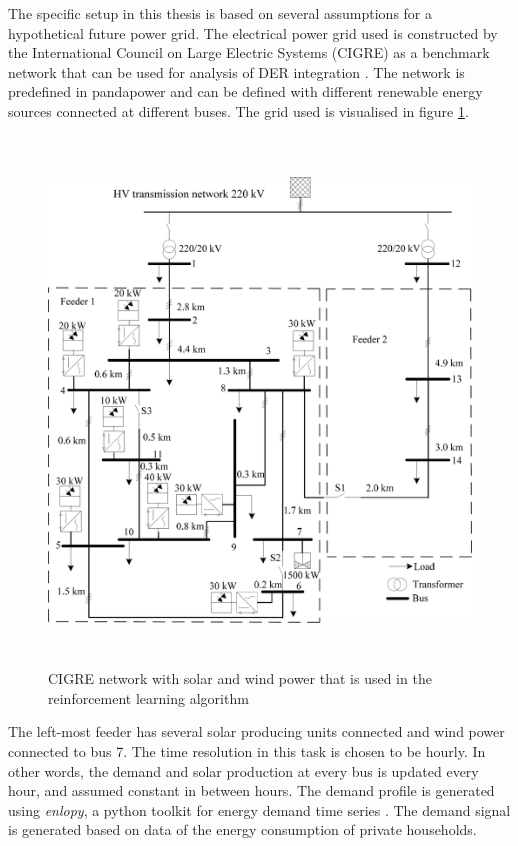 \documentclass[class=book, crop=false]{standalone}
\begin{document}
The specific setup in this thesis is based on several assumptions for a hypothetical future power grid. The electrical power grid used is constructed by the International Council on Large Electric Systems (CIGRE) as a benchmark network that can be used for analysis of DER integration \cite{cigre}. The network is predefined in pandapower and can be defined with different renewable energy sources connected at different buses. The grid used is visualised in figure \ref{fig:problem:cigre_network}. 

\begin{figure}[ht]
    \includegraphics[height=14cm, width=13.5cm]{figures/cigre_network_mv_der.png}
    \caption[size = 9]{CIGRE network with solar and wind power that is used in the reinforcement learning algorithm}
    \label{fig:problem:cigre_network}
\end{figure}
The left-most feeder has several solar producing units connected and wind power connected to bus 7. The time resolution in this task is chosen to be hourly. In other words, the demand and solar production at every bus is updated every hour, and assumed constant in between hours. The demand profile is generated using \textit{enlopy}, a python toolkit for energy demand time series \cite{enlopy}. The demand signal is generated based on data of the energy consumption of private households.
\end{document}
